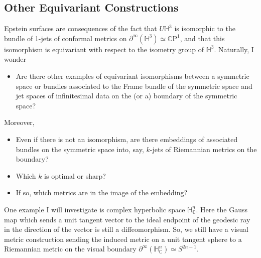 \documentclass[11pt]{amsart}
\newcommand{\C}{\mathbb{C}}
\newcommand{\CP}{\mathbb{C}\mathrm{P}}
\renewcommand{\H}{\mathbb{H}}
\begin{document}
\subsection{Other Equivariant Constructions}

Epstein surfaces are consequences of the fact that $U\H^3$ is isomorphic to the bundle of 1-jets of conformal metrics on $\partial^\infty( \H^3) \simeq \CP^1$, and that this isomorphism is equivariant with respect to the isometry group of $\H^3$. 
Naturally, I wonder
\begin{itemize}

\item Are there other examples of equivariant isomorphisms between a symmetric space or bundles associated to the Frame bundle of the symmetric space and jet spaces of infinitesimal data on the (or a) boundary of the symmetric space? 

\end{itemize}

Moreover, 

\begin{itemize}

\item Even if there is not an isomorphism, are there embeddings of associated bundles on the symmetric space into, say, $k$-jets of Riemannian metrics on the boundary?

\item Which $k$ is optimal or sharp?

\item If so, which metrics are in the image of the embedding?

\end{itemize}

One example I will investigate is complex hyperbolic space $\H_{\C}^n$.
Here the Gauss map which sends a unit tangent vector to the ideal endpoint of the geodesic ray in the direction of the vector is still a diffeomorphism. So, we still have a visual metric construction sending the induced metric on a unit tangent sphere to a Riemannian metric on the visual boundary $\partial^\infty (\H_{\C}^n) \simeq S^{2n-1}$. 
\end{document}
